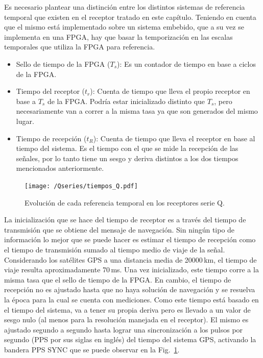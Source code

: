 \documentclass[a4paper,12pt,oneside,onecolumn,final,openright]{book}%
\begin{document}
	Es necesario plantear una distinción entre los distintos sistemas de referencia temporal que existen en el receptor tratado en este capítulo. Teniendo en cuenta que el mismo está implementado sobre un sistema embebido, que a su vez se implementa en una FPGA, hay que basar la temporización en las escalas temporales que utiliza la FPGA para referencia. 
\begin{itemize}
	\item Sello de tiempo de la FPGA ($T_s$): Es un contador de tiempo en base a ciclos de la FPGA. 
	\item Tiempo del receptor ($t_r$): Cuenta de tiempo que lleva el propio receptor en base a $T_s$ de la FPGA. Podría estar inicializado distinto que $T_s$, pero necesariamente van a correr a la misma tasa ya que son generados del mismo lugar.
	\item Tiempo de recepción ($t_R$): Cuenta de tiempo que lleva el receptor en base al tiempo del sistema. Es el tiempo con el que se mide la recepción de las señales, por lo tanto tiene un sesgo y deriva distintos a los dos tiempos mencionados anteriormente.
\end{itemize}
\begin{figure}
    \centering
    \texttt{[image: /Qseries/tiempos\_Q.pdf]}
    \caption{Evolución de cada referencia temporal en los receptores serie Q.}
    \label{fig:tiemposQ}
\end{figure}
	La inicialización que se hace del tiempo de receptor es a través del tiempo de transmisión que se obtiene del mensaje de navegación. Sin ningún tipo de información lo mejor que se puede hacer es estimar el tiempo de recepción como el tiempo de transmisión sumado al tiempo medio de viaje de la señal. Considerando los satélites GPS a una distancia media de 20000\,km, el tiempo de viaje resulta aproximadamente 70\,ms. Una vez inicializado, este tiempo corre a la misma tasa que el sello de tiempo de la FPGA. En cambio, el tiempo de recepción no es ajustado hasta que no haya solución de navegación y se resuelva la época para la cual se cuenta con mediciones. Como este tiempo está basado en el tiempo del sistema, va a tener su propia deriva pero es llevado a un valor de sesgo nulo (al menos para la resolución manejada en el receptor). El mismo es ajustado segundo a segundo hasta lograr una sincronización a los pulsos por segundo (PPS por sus siglas en inglés) del tiempo del sistema GPS, activando la bandera PPS SYNC que se puede observar en la Fig.~\ref{fig:tiemposQ}.
	
\end{document}
